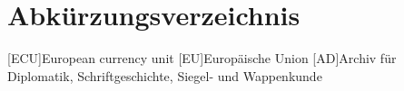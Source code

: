 \clearpage
\chapter*{Abkürzungsverzeichnis}	






\begin{acronym}[ECU]
	[ECU]{European currency unit}
	[EU]{Europäische Union}
	[AD]{Archiv für Diplomatik, Schriftgeschichte, Siegel- und Wappenkunde}
\end{acronym}